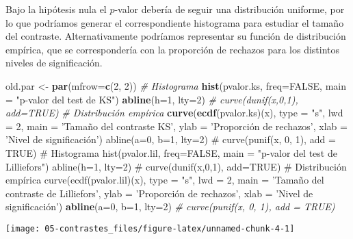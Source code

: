 \documentclass[
]{book}
\newenvironment{Shaded}{\begin{snugshade}}{\end{snugshade}}
\newcommand{\CommentTok}[1]{\textcolor[rgb]{0.56,0.35,0.01}{\textit{#1}}}
\newcommand{\DataTypeTok}[1]{\textcolor[rgb]{0.13,0.29,0.53}{#1}}
\newcommand{\DecValTok}[1]{\textcolor[rgb]{0.00,0.00,0.81}{#1}}
\newcommand{\KeywordTok}[1]{\textcolor[rgb]{0.13,0.29,0.53}{\textbf{#1}}}
\newcommand{\NormalTok}[1]{#1}
\newcommand{\OtherTok}[1]{\textcolor[rgb]{0.56,0.35,0.01}{#1}}
\newcommand{\StringTok}[1]{\textcolor[rgb]{0.31,0.60,0.02}{#1}}
\theoremstyle{break}
\theoremstyle{definition}
\theoremstyle{definition}
\theoremstyle{definition}
\theoremstyle{remark}
\begin{document}
Bajo la hipótesis nula el \(p\)-valor debería de seguir una distribución uniforme,
por lo que podríamos generar el correspondiente histograma para estudiar el
tamaño del contraste. Alternativamente podríamos representar su función de
distribución empírica, que se correspondería con la proporción de rechazos
para los distintos niveles de significación.

\begin{Shaded}
\begin{Highlighting}[]
\NormalTok{old.par <-}\StringTok{ }\KeywordTok{par}\NormalTok{(}\DataTypeTok{mfrow=}\KeywordTok{c}\NormalTok{(}\DecValTok{2}\NormalTok{, }\DecValTok{2}\NormalTok{))}
\CommentTok{# Histograma}
\KeywordTok{hist}\NormalTok{(pvalor.ks, }\DataTypeTok{freq=}\OtherTok{FALSE}\NormalTok{, }\DataTypeTok{main =} \StringTok{"p-valor del test de KS"}\NormalTok{)}
\KeywordTok{abline}\NormalTok{(}\DataTypeTok{h=}\DecValTok{1}\NormalTok{, }\DataTypeTok{lty=}\DecValTok{2}\NormalTok{)   }\CommentTok{# curve(dunif(x,0,1), add=TRUE)}
\CommentTok{# Distribución empírica}
\KeywordTok{curve}\NormalTok{(}\KeywordTok{ecdf}\NormalTok{(pvalor.ks)(x), }\DataTypeTok{type =} \StringTok{"s"}\NormalTok{, }\DataTypeTok{lwd =} \DecValTok{2}\NormalTok{, }
      \DataTypeTok{main =} \StringTok{'Tamaño del contraste KS'}\NormalTok{, }\DataTypeTok{ylab =} \StringTok{'Proporción de rechazos'}\NormalTok{, }
      \DataTypeTok{xlab =} \StringTok{'Nivel de significación')}
\StringTok{abline(a=0, b=1, lty=2)   # curve(punif(x, 0, 1), add = TRUE)}
\StringTok{# Histograma}
\StringTok{hist(pvalor.lil, freq=FALSE, main = "p-valor del test de Lilliefors")}
\StringTok{abline(h=1, lty=2)   # curve(dunif(x,0,1), add=TRUE)}
\StringTok{# Distribución empírica}
\StringTok{curve(ecdf(pvalor.lil)(x), type = "s", lwd = 2, }
\StringTok{      main = '}\NormalTok{Tamaño del contraste de Lilliefors}\StringTok{', ylab = '}\NormalTok{Proporción de rechazos}\StringTok{', }
\StringTok{      xlab = '}\NormalTok{Nivel de significación')}
\KeywordTok{abline}\NormalTok{(}\DataTypeTok{a=}\DecValTok{0}\NormalTok{, }\DataTypeTok{b=}\DecValTok{1}\NormalTok{, }\DataTypeTok{lty=}\DecValTok{2}\NormalTok{)   }\CommentTok{# curve(punif(x, 0, 1), add = TRUE)}
\end{Highlighting}
\end{Shaded}

\begin{center}\texttt{[image: 05-contrastes\_files/figure-latex/unnamed-chunk-4-1]} \end{center}
\end{document}
